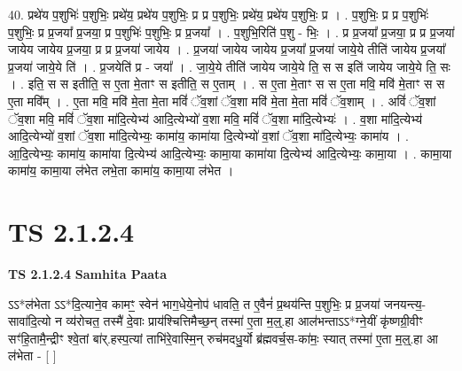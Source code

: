 \documentclass[17pt]{extarticle}
\begin{document}
40. प्रथे॑य प॒शुभिः॑ प॒शुभिः॒ प्रथे॑य॒ प्रथे॑य प॒शुभिः॒ प्र प्र प॒शुभिः॒ प्रथे॑य॒ प्रथे॑य प॒शुभिः॒ प्र । . प॒शुभिः॒ प्र प्र प॒शुभिः॑ प॒शुभिः॒ प्र प्र॒जया᳚ प्र॒जया॒ प्र प॒शुभिः॑ प॒शुभिः॒ प्र प्र॒जया᳚ । . प॒शुभि॒रिति॑ प॒शु - भिः॒ । . प्र प्र॒जया᳚ प्र॒जया॒ प्र प्र प्र॒जया॑ जायेय जायेय प्र॒जया॒ प्र प्र प्र॒जया॑ जायेय । . प्र॒जया॑ जायेय जायेय प्र॒जया᳚ प्र॒जया॑ जाये॒ये तीति॑ जायेय प्र॒जया᳚ प्र॒जया॑ जाये॒ये ति॑ । . प्र॒जयेति॑ प्र - जया᳚ । . जा॒ये॒ये तीति॑ जायेय जाये॒ये ति॒ स स इति॑ जायेय जाये॒ये ति॒ सः । . इति॒ स स इतीति॒ स ए॒ता मे॒ताꣳ स इतीति॒ स ए॒ताम् । . स ए॒ता मे॒ताꣳ स स ए॒ता मवि॒ मवि॑ मे॒ताꣳ स स ए॒ता मवि᳚म् । . ए॒ता मवि॒ मवि॑ मे॒ता मे॒ता मविं॑ ॅव॒शां ॅव॒शा मवि॑ मे॒ता मे॒ता मविं॑ ॅव॒शाम् । . अविं॑ ॅव॒शां ॅव॒शा मवि॒ मविं॑ ॅव॒शा मा॑दि॒त्येभ्य॑ आदि॒त्येभ्यो॑ व॒शा मवि॒ मविं॑ ॅव॒शा मा॑दि॒त्येभ्यः॑ । . व॒शा मा॑दि॒त्येभ्य॑ आदि॒त्येभ्यो॑ व॒शां ॅव॒शा मा॑दि॒त्येभ्यः॒ कामा॑य॒ कामा॑या दि॒त्येभ्यो॑ व॒शां ॅव॒शा मा॑दि॒त्येभ्यः॒ कामा॑य । . आ॒दि॒त्येभ्यः॒ कामा॑य॒ कामा॑या दि॒त्येभ्य॑ आदि॒त्येभ्यः॒ कामा॒या कामा॑या दि॒त्येभ्य॑ आदि॒त्येभ्यः॒ कामा॒या । . कामा॒या कामा॑य॒ कामा॒या ल॑भेत लभे॒ता कामा॑य॒ कामा॒या ल॑भेत । \newline
\pagebreak
{}

\section{ TS 2.1.2.4 }

\textbf{TS 2.1.2.4 } \newline
\textbf{Samhita Paata} \newline

ऽऽ*ल॑भेता ऽऽ*दि॒त्याने॒व कामꣳ॒॒ स्वेन॑ भाग॒धेये॒नोप॑ धावति॒ त ए॒वैनं॑ प्र॒थय॑न्ति प॒शुभिः॒ प्र प्र॒जया॑ जनयन्त्य॒-सावा॑दि॒त्यो न व्य॑रोचत॒ तस्मै॑ दे॒वाः प्राय॑श्चित्तिमैच्छ॒न् तस्मा॑ ए॒ता म॒ल्॒.हा आल॑भन्ताऽऽ*ग्ने॒यीं कृ॑ष्णग्री॒वीꣳ सꣳ॑हि॒तामै॒न्द्रीꣳ श्वे॒तां बा॑र्.हस्प॒त्यां ताभि॑रे॒वास्मि॒न् रुच॑मदधु॒र्यो ब्र॑ह्मवर्च॒स-का॑मः॒ स्यात् तस्मा॑ ए॒ता म॒॒ल्॒.हा आ ल॑भेता - [  ] \newline
\end{document}
